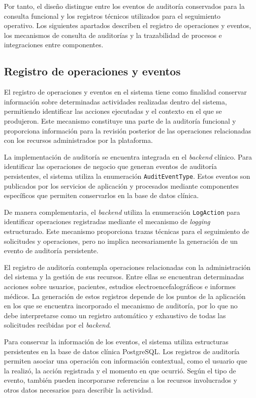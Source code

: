 Por tanto, el diseño distingue entre los eventos de auditoría conservados para la consulta funcional y los registros técnicos utilizados para el seguimiento operativo. Los siguientes apartados describen el registro de operaciones y eventos, los mecanismos de consulta de auditorías y la trazabilidad de procesos e integraciones entre componentes.


\subsection{Registro de operaciones y eventos}
\label{subsec:registro-operaciones-eventos}

El registro de operaciones y eventos en el sistema tiene como finalidad conservar información sobre determinadas actividades realizadas dentro del sistema, permitiendo identificar las acciones ejecutadas y el contexto en el que se produjeron. Este mecanismo constituye una parte de la auditoría funcional y proporciona información para la revisión posterior de las operaciones relacionadas con los recursos administrados por la plataforma.

La implementación de auditoría se encuentra integrada en el \textit{backend}
clínico. Para identificar las operaciones de negocio que generan
eventos de auditoría persistentes, el sistema utiliza la enumeración
\texttt{AuditEventType}. Estos eventos son publicados por los servicios
de aplicación y procesados mediante componentes específicos que
permiten conservarlos en la base de datos clínica.

De manera complementaria, el \textit{backend} utiliza la enumeración
\texttt{LogAction} para identificar operaciones registradas mediante
el mecanismo de \textit{logging} estructurado. Este mecanismo proporciona
trazas técnicas para el seguimiento de solicitudes y operaciones,
pero no implica necesariamente la generación de un evento de
auditoría persistente.

El registro de auditoría contempla operaciones relacionadas con la administración del sistema y la gestión de sus recursos. Entre ellas se encuentran determinadas acciones sobre usuarios, pacientes, estudios electroencefalográficos e informes médicos. La generación de estos registros depende de los puntos de la aplicación en los que se encuentra incorporado el mecanismo de auditoría, por lo que no debe interpretarse como un registro automático y exhaustivo de todas las solicitudes recibidas por el \textit{backend}.

Para conservar la información de los eventos, el sistema utiliza estructuras persistentes en la base de datos clínica PostgreSQL. Los registros de auditoría permiten asociar una operación con información contextual, como el usuario que la realizó, la acción registrada y el momento en que ocurrió. Según el tipo de evento, también pueden incorporarse referencias a los recursos involucrados y otros datos necesarios para describir la actividad.

